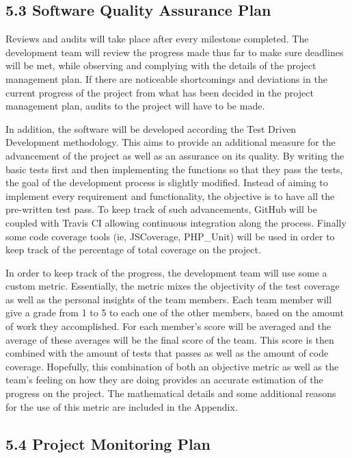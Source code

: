 \documentclass[]{article}
\begin{document}
\subsection{5.3 Software Quality Assurance
Plan}\label{software-quality-assurance-plan}

Reviews and audits will take place after every milestone completed. The
development team will review the progress made thus far to make sure
deadlines will be met, while observing and complying with the details of
the project management plan. If there are noticeable shortcomings and
deviations in the current progress of the project from what has been
decided in the project management plan, audits to the project will have
to be made.

In addition, the software will be developed according the Test Driven
Development methodology. This aims to provide an additional measure for
the advancement of the project as well as an assurance on its quality.
By writing the basic tests first and then implementing the functions so
that they pass the tests, the goal of the development process is
slightly modified. Instead of aiming to implement every requirement and
functionality, the objective is to have all the pre-written test pass.
To keep track of such advancements, GitHub will be coupled with Travis
CI allowing continuous integration along the process. Finally some code
coverage tools (ie, JSCoverage, PHP\_Unit) will be used in order to keep
track of the percentage of total coverage on the project.

In order to keep track of the progress, the development team will use
some a custom metric. Essentially, the metric mixes the objectivity of
the test coverage as well as the personal insights of the team members.
Each team member will give a grade from 1 to 5 to each one of the other
members, based on the amount of work they accomplished. For each
member's score will be averaged and the average of these averages will
be the final score of the team. This score is then combined with the
amount of tests that passes as well as the amount of code coverage.
Hopefully, this combination of both an objective metric as well as the
team's feeling on how they are doing provides an accurate estimation of
the progress on the project. The mathematical details and some
additional reasons for the use of this metric are included in the
Appendix.

\subsection{5.4 Project Monitoring Plan}\label{project-monitoring-plan}
\end{document}
